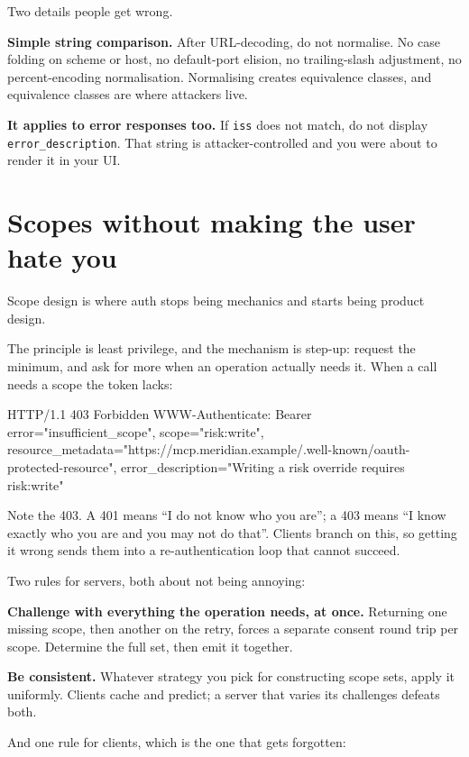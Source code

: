 Two details people get wrong.

\textbf{Simple string comparison.} After URL-decoding, do not normalise. No case
folding on scheme or host, no default-port elision, no trailing-slash
adjustment, no percent-encoding normalisation. Normalising creates equivalence
classes, and equivalence classes are where attackers live.

\textbf{It applies to error responses too.} If \texttt{iss} does not match, do
not display \texttt{error\_description}. That string is attacker-controlled and
you were about to render it in your UI.

\section{Scopes without making the user hate you}

Scope design is where auth stops being mechanics and starts being product
design.

The principle is least privilege, and the mechanism is step-up: request the
minimum, and ask for more when an operation actually needs it. When a call needs
a scope the token lacks:

\begin{http}
HTTP/1.1 403 Forbidden
WWW-Authenticate: Bearer error="insufficient_scope",
                         scope="risk:write",
                         resource_metadata="https://mcp.meridian.example/.well-known/oauth-protected-resource",
                         error_description="Writing a risk override requires risk:write"
\end{http}

Note the 403. A 401 means ``I do not know who you are''; a 403 means ``I know
exactly who you are and you may not do that''. Clients branch on this,
so getting it wrong sends them into a re-authentication loop that cannot succeed.

Two rules for servers, both about not being annoying:

\textbf{Challenge with everything the operation needs, at once.} Returning one
missing scope, then another on the retry, forces a separate consent round trip
per scope. Determine the full set, then emit it together.

\textbf{Be consistent.} Whatever strategy you pick for constructing scope sets,
apply it uniformly. Clients cache and predict; a server that varies its
challenges defeats both.

And one rule for clients, which is the one that gets forgotten:

